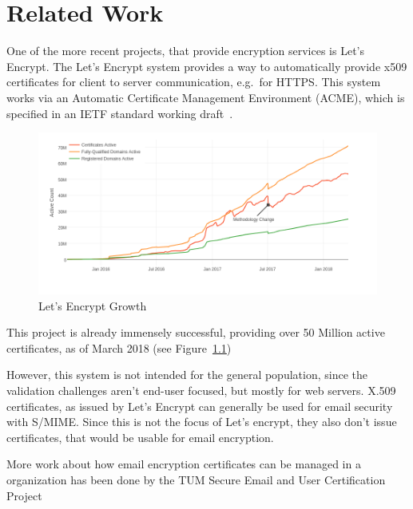 \chapter{Related Work}\label{ch:relatedWork}
One of the more recent projects, that provide encryption services is Let's Encrypt.
The Let's Encrypt system provides a way to automatically provide x509 certificates for client to server communication,
e.g.\ for HTTPS\@.
This system works via an Automatic Certificate Management Environment (ACME), which is specified in an IETF standard
working draft~\cite{letsencrypteacme}.

\begin{figure}
    \centering
    \includegraphics[width=\textwidth]{figures/letsencryptusers.png}
    \caption{Let's Encrypt Growth~\cite{letsencryptstats}}
    \label{fig:letsencrypt}
\end{figure}

This project is already immensely successful, providing over 50 Million active certificates, as of March 2018 (see
Figure~\ref{fig:letsencrypt})

However, this system is not intended for the general population, since the validation challenges aren't end-user
focused, but mostly for web servers.
X.509 certificates, as issued by Let's Encrypt can generally be used for email security with S/MIME\@.
Since this is not the focus of Let's encrypt, they also don't issue certificates, that would be usable for email
encryption.

More work about how email encryption certificates can be managed in a organization has been done by the TUM Secure
Email and User Certification Project~\cite{hauner2016interoperability, jagdish2016certservice, straub2016directoryservice, maier2015multidevice}

